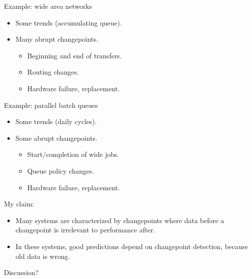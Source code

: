 \documentclass[pdf,letterpaper,allen]{prosper}
\begin{document}
\begin{slide}{}

Example: wide area networks

\begin{itemize}

\item Some trends (accumulating queue). 

\item Many abrupt changepoints.

\begin{itemize}

\item Beginning and end of transfers.

\item Routing changes.

\item Hardware failure, replacement.

\end{itemize}

\end{itemize}

\end{slide}


\begin{slide}{}

Example: parallel batch queues

\begin{itemize}

\item Some trends (daily cycles). 

\item Some abrupt changepoints.

\begin{itemize}

\item Start/completion of wide jobs.

\item Queue policy changes.

\item Hardware failure, replacement.

\end{itemize}

\end{itemize}

\end{slide}


\begin{slide}{}

My claim: 

\begin{itemize}

\item Many systems are characterized by changepoints
where data before a changepoint is irrelevant to
performance after.

\item In these systems, good predictions depend on
changepoint detection, because {\red old data is wrong}.

\end{itemize}

Discussion?

\end{slide}
\end{document}
